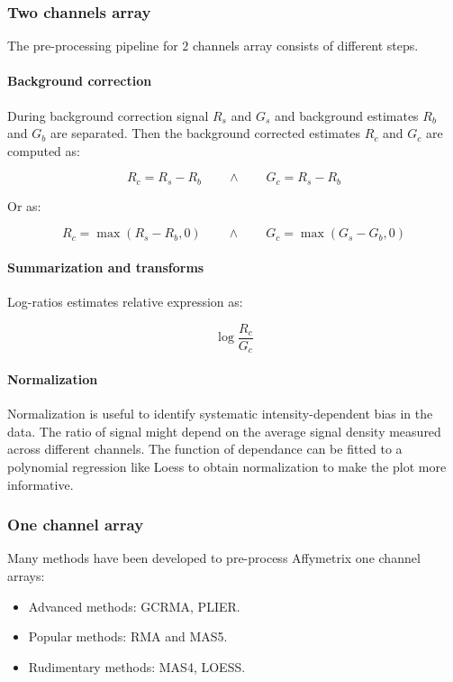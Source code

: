		\subsubsection{Two channels array}
		The pre-processing pipeline for $2$ channels array consists of different steps.

			\paragraph{Background correction}
			During background correction signal $R_s$ and $G_s$ and background estimates $R_b$ and $G_b$ are separated.
			Then the background corrected estimates $R_c$ and $G_c$ are computed as:

			$$R_c = R_s-R_b\qquad\land\qquad G_c = R_s-R_b$$

			Or as:

			$$R_c = \max(R_s-R_b, 0)\qquad\land\qquad G_c = \max(G_s-G_b, 0)$$

			\paragraph{Summarization and transforms}
			Log-ratios estimates relative expression as:

			$$\log\frac{R_c}{G_c}$$

			\paragraph{Normalization}
			Normalization is useful to identify systematic intensity-dependent bias in the data.
			The ratio of signal might depend on the average signal density measured across different channels.
			The function of dependance can be fitted to a polynomial regression like Loess to obtain normalization to make the plot more informative.

		\subsubsection{One channel array}
		Many methods have been developed to pre-process Affymetrix one channel arrays:

		\begin{multicols}{3}
			\begin{itemize}
				\item Advanced methods: GCRMA, PLIER.
				\item Popular methods: RMA and MAS5.
				\item Rudimentary methods: MAS4, LOESS.
			\end{itemize}
		\end{multicols}


